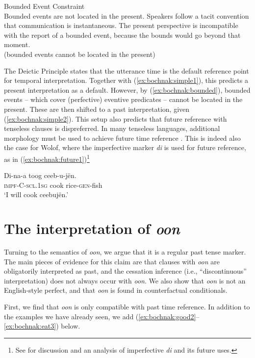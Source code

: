 \documentclass[output=paper,newtxmath,modfonts,nonflat,draftmode]{langsci/langscibook}
\begin{document}
\ea\label{ex:bochnak:bounded} {Bounded Event Constraint} \\ Bounded events are not located in the present. Speakers follow a tacit convention that communication is instantaneous. The present perspective is incompatible with the report of a bounded event, because the bounds would go beyond that moment. \\
(bounded events cannot be located in the present)
\z

The Deictic Principle states that the utterance time is the default reference point for temporal interpretation. Together with (\ref{ex:bochnak:simple1}), this predicts a present interpretation as a default. However, by (\ref{ex:bochnak:bounded}), bounded events -- which cover (perfective) eventive predicates -- cannot be located in the present. These are then shifted to a past interpretation, given (\ref{ex:bochnak:simple2}). This setup also predicts that future reference with tenseless clauses is dispreferred. In many tenseless languages, additional morphology must be used to achieve future time reference \citep{matthewson06temporal, tonhauser11temporal, bochnak16past}. This is indeed also the case for Wolof, where the imperfective marker \textit{di} is used for future reference, as in (\ref{ex:bochnak:future1})\footnote{See \citealt{bochnak17deriving} for discussion and an analysis of imperfective \textit{di} and its future uses.}

\ea
\gll Di-na-a toog ceeb-u-j\"en.\\
\textsc{impf}-C-\textsc{scl.1sg}  cook rice-\textsc{gen}-fish\\
\glt `I will cook ceebuj\"en.'\label{ex:bochnak:future1}
\z


\section{The interpretation of \textit{oon}}\label{sec:bochnak:3}

Turning to the semantics of \textit{oon}, we argue that it is a
regular past tense marker. The main pieces of evidence for this claim are that clauses with \textit{oon} are obligatorily interpreted as
past, and the cessation inference (i.e., ``discontinuous'' interpretation) does not always occur with \textit{oon}. We also show that
\textit{oon} is not an English-style perfect, and that \textit{oon} is
found in counterfactual conditionals.

First, we find that \textit{oon} is only compatible with past time reference. In addition to the examples we have already seen, we add (\ref{ex:bochnak:good2}--\ref{ex:bochnak:eat3}) below.
\end{document}
